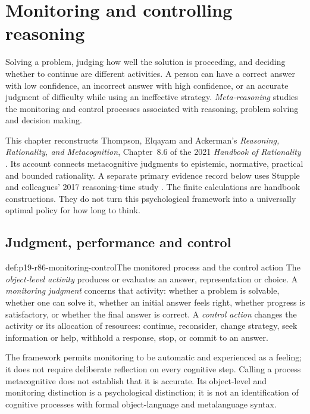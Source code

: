\chapter{Monitoring and controlling reasoning}
\label{sec:p19-rationality-8-6}

Solving a problem, judging how well the solution is proceeding, and deciding
whether to continue are different activities. A person can have a correct
answer with low confidence, an incorrect answer with high confidence, or
an accurate judgment of difficulty while using an ineffective strategy.
\emph{Meta-reasoning} studies the monitoring and control processes associated
with reasoning, problem solving and decision making.

This chapter reconstructs Thompson, Elqayam and Ackerman's
\emph{Reasoning, Rationality, and Metacognition}, Chapter~8.6 of the 2021
\emph{Handbook of Rationality} \cite{ThompsonElqayamAckerman2021MetaReasoning}.
Its account connects metacognitive judgments to epistemic, normative,
practical and bounded rationality. A separate primary evidence record below
uses Stupple and colleagues' 2017 reasoning-time study
\cite{StuppleEtAl2017Slower}. The finite calculations are handbook
constructions. They do not turn this psychological framework into a
universally optimal policy for how long to think.

\section{Judgment, performance and control}
\label{sec:p19-r86-judgments}

\begin{hbdefinition}{def:p19-r86-monitoring-control}{The monitored process and the control action}
The \emph{object-level activity} produces or evaluates an answer, representation
or choice. A \emph{monitoring judgment} concerns that activity: whether a
problem is solvable, whether one can solve it, whether an initial answer feels
right, whether progress is satisfactory, or whether the final answer is correct.
A \emph{control action} changes the activity or its allocation of resources:
continue, reconsider, change strategy, seek information or help, withhold a
response, stop, or commit to an answer.

The framework permits monitoring to be automatic and experienced as a feeling;
it does not require deliberate reflection on every cognitive step. Calling a
process metacognitive does not establish that it is accurate. Its object-level
and monitoring distinction is a psychological distinction; it is not an
identification of cognitive processes with formal object-language and
metalanguage syntax.
\end{hbdefinition}

